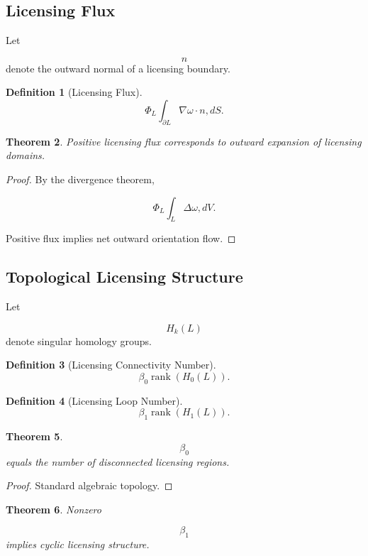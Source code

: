\documentclass[12pt]{article}
\newtheorem{theorem}{Theorem}[section]
\newtheorem{definition}[theorem]{Definition}
\theoremstyle{remark}
\begin{document}
\subsection{Licensing Flux}

Let

\[
n
\]
denote the outward normal of a licensing boundary.

\begin{definition}[Licensing Flux]
\[
\Phi_L
\int_{\partial L}
\nabla\omega\cdot n
,dS.
\]
\end{definition}

\begin{theorem}
Positive licensing flux corresponds to outward expansion of licensing domains.
\end{theorem}

\begin{proof}
By the divergence theorem,

\[
\Phi_L
\int_L
\Delta\omega
,dV.
\]

Positive flux implies net outward orientation flow.
\end{proof}

\subsection{Topological Licensing Structure}

Let

\[
H_k(L)
\]
denote singular homology groups.

\begin{definition}[Licensing Connectivity Number]
\[
\beta_0
\operatorname{rank}(H_0(L)).
\]
\end{definition}

\begin{definition}[Licensing Loop Number]
\[
\beta_1
\operatorname{rank}(H_1(L)).
\]
\end{definition}

\begin{theorem}
\[
\beta_0
\]
equals the number of disconnected licensing regions.
\end{theorem}

\begin{proof}
Standard algebraic topology.
\end{proof}

\begin{theorem}
Nonzero

\[
\beta_1
\]
implies cyclic licensing structure.
\end{theorem}
\end{document}
